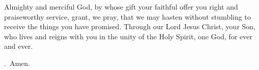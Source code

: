 \lettrine[lines=3]{A}{}lmighty and merciful God, by whose gift your faithful offer you right and praiseworthy service, grant, we pray, that we may hasten without stumbling to receive the things you have promised. Through our Lord Jesus Christ, your Son, who lives and reigns with you in the unity of the Holy Spirit, one God, for ever and ever. \par \Rbar.~Amen.
